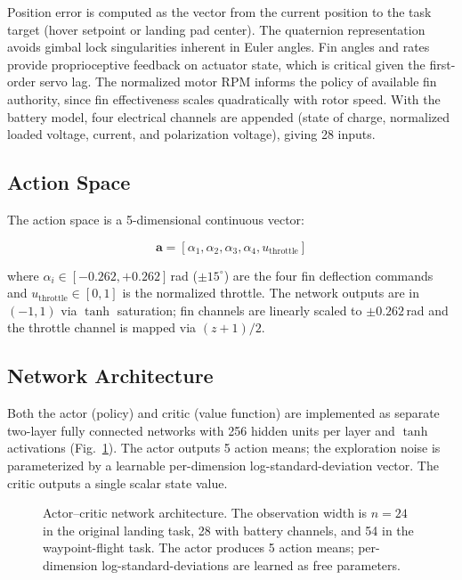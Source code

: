 \documentclass[conference]{IEEEtran}
\begin{document}
Position error is computed as the vector from the current position to the task target (hover setpoint or landing pad center). The quaternion representation avoids gimbal lock singularities inherent in Euler angles. Fin angles and rates provide proprioceptive feedback on actuator state, which is critical given the first-order servo lag. The normalized motor RPM informs the policy of available fin authority, since fin effectiveness scales quadratically with rotor speed. With the battery model, four electrical channels are appended (state of charge, normalized loaded voltage, current, and polarization voltage), giving 28 inputs.

\subsection{Action Space}

The action space is a 5-dimensional continuous vector:

\begin{equation}
\mathbf{a} = [\alpha_1, \alpha_2, \alpha_3, \alpha_4, u_{\text{throttle}}]
\label{eq:action}
\end{equation}

\noindent where $\alpha_i \in [-0.262, +0.262]$\,rad ($\pm 15^\circ$) are the four fin deflection commands and $u_{\text{throttle}} \in [0, 1]$ is the normalized throttle. The network outputs are in $(-1, 1)$ via $\tanh$ saturation; fin channels are linearly scaled to $\pm 0.262$\,rad and the throttle channel is mapped via $(z + 1)/2$.

\subsection{Network Architecture}

Both the actor (policy) and critic (value function) are implemented as separate two-layer fully connected networks with 256 hidden units per layer and $\tanh$ activations (Fig.~\ref{fig:network_arch}). The actor outputs 5 action means; the exploration noise is parameterized by a learnable per-dimension log-standard-deviation vector. The critic outputs a single scalar state value.

\begin{figure}[htbp]
\centering
{}
\caption{Actor--critic network architecture. The observation width is $n = 24$ in the original landing task, 28 with battery channels, and 54 in the waypoint-flight task. The actor produces 5 action means; per-dimension log-standard-deviations are learned as free parameters.}
\label{fig:network_arch}
\end{figure}
\end{document}
